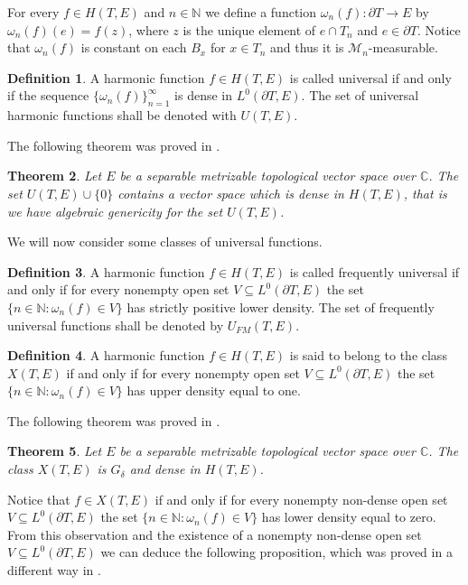 \documentclass[twoside, 11pt]{article}
\newcommand{\C}{\mathbb{C}}
\newcommand{\N}{\mathbb{N}}
\theoremstyle{plain}
\newtheorem{theorem}{Theorem}[section]
\theoremstyle{definition}
\newtheorem{definition}[theorem]{Definition}
\begin{document}
For every $f \in H(T,E)$ and $n \in \N$ we define a function $\omega_n(f): \partial T \to E$ by $\omega_n(f)(e) = f(z)$, where $z$ is the unique element of $e \cap T_n$ and $e \in \partial T$.
Notice that $\omega_n(f)$ is constant on each $B_x$ for $x \in T_n$ and thus it is $\mathcal{M}_n$-measurable.
\begin{definition}
A harmonic function $f \in H(T,E)$ is called universal if and only if the sequence $\{\omega_n(f)\}_{n=1}^{\infty}$ is dense in $L^0(\partial T, E)$.
The set of universal harmonic functions shall be denoted with $U(T,E)$.
\end{definition}
The following theorem was proved in \cite{BIEHLER2}.
\begin{theorem}
Let $E$ be a separable metrizable topological vector space over $\C$. The set $U(T,E) \cup \{0\}$ contains a vector space which is dense in $H(T,E)$, that is we have algebraic genericity for the set $U(T,E)$.
\end{theorem}
We will now consider some classes of universal functions.
\begin{definition}
A harmonic function $f \in H(T,E)$ is called frequently universal if and only if for every nonempty open set $V \subseteq L^0(\partial T, E)$ the set $\{ n\in \N: \omega_n(f) \in V\}$ has strictly positive lower density. The set of frequently universal functions shall be denoted by $U_{FM}(T,E)$.
\end{definition}

\begin{definition}
A harmonic function $f \in H(T,E)$ is said to belong to the class $X(T,E)$ if and only if for every nonempty open set $V \subseteq L^0(\partial T,E)$ the set $\{ n\in \N: \omega_n(f) \in V\}$ has upper density equal to one.
\end{definition}

The following theorem was proved in \cite{BIEHLER2}.

\begin{theorem}
\label{thm:Xdens}
Let $E$ be a separable metrizable topological vector space over $\C$. The class $X(T,E)$ is $G_{\delta}$ and dense in $H(T,E)$.
\end{theorem}

Notice that $f \in X(T,E)$ if and only if for every nonempty non-dense open set $V \subseteq L^0(\partial T, E)$ the set $\{ n\in \N: \omega_n(f) \in V\}$ has lower density equal to zero.
From this observation and the existence of a nonempty non-dense open set $V \subseteq L^0(\partial T, E)$ we can deduce the following proposition, which was proved in a different way in \cite{BIEHLER1}.
\end{document}
